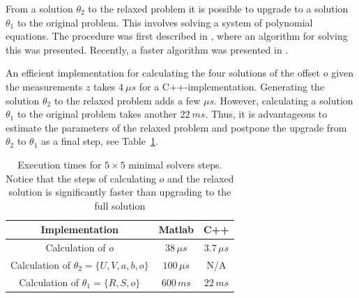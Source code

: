 \documentclass{article}
\begin{document}
From a solution $\theta_2$ to the relaxed problem it is possible to upgrade to a solution $\theta_1$ to the original problem. This involves solving a system of polynomial equations. The procedure was first described in \cite{kuang-burgess-etal-icassp-13}, where an algorithm for solving this was presented. Recently, a faster algorithm was presented in \cite{larsson2017polynomial}.

An efficient implementation for calculating the four solutions of the offset $o$ given the measurements $z$ takes $4~ \mu s$ for a C++-implementation. Generating the solution $\theta_2$ to the relaxed problem adds a few $\mu s$. However, calculating a solution $\theta_1$ to the original problem takes another $22 ~ms$. Thus, it is advantageous to estimate the parameters of the relaxed problem and postpone the upgrade from $\theta_2$ to $\theta_1$ as a final step, see Table~\ref{Tabletime}.

\begin{table}
\caption{Execution times for $5 \times 5$ minimal solvers steps. Notice that the steps of calculating $o$ and the relaxed solution is significantly faster than upgrading to the full solution}
\centering
\vspace{4mm}
\begin{tabular}{@{}ccc@{}} \toprule
Implementation & Matlab  & C++ \\
\midrule 
Calculation of $o$ & $38 \, \mu s$ & $3.7 \, \mu s$ \\
Calculation of $\theta_2 = \{ U,V,a,b,o \}$ & $100 \, \mu s$ & N/A \\
Calculation of $\theta_1 = \{ R,S,o \}$ & $600 \, ms$ & $22 \, ms$ \\
\bottomrule
\end{tabular}
\label{Tabletime}
\end{table}

\vspace{-5pt}
\end{document}
